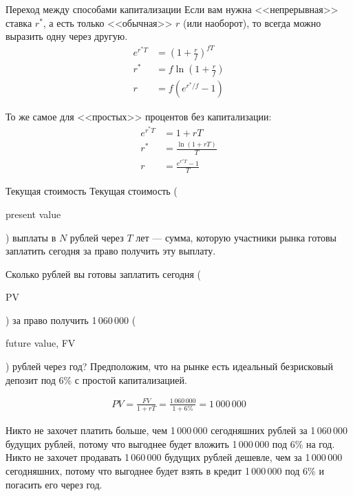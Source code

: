 \documentclass{beamer}
\newcommand{\en}[1]{\begin{otherlanguage}{english}#1\end{otherlanguage}}
\begin{document}
\begin{frame}{Переход между способами капитализации}
\justify
Если вам нужна <<непрерывная>> ставка $r^*$, а есть только <<обычная>> $r$ (или наоборот), то всегда можно выразить одну через другую.
\begin{align*}
e^{r^*T} &= \left(1 + \frac{r}{f}\right)^{fT} \\
r^* &= f\ln \left(1 + \frac{r}{f}\right) \\
r &= f\left(e^{r^*/f} - 1\right)
\end{align*}

\justify
То же самое для <<простых>> процентов без капитализации:
\begin{align*}
e^{r^*T} &= 1+rT \\
r^* &= \frac{\ln(1+rT)}{T} \\
r &= \frac{e^{r^*T}-1}{T}
\end{align*}

\end{frame}



\begin{frame}{Текущая стоимость}
\justify
Текущая стоимость (\en{present value}) выплаты в $N$ рублей через $T$ лет --- сумма, 
которую участники рынка готовы заплатить сегодня за право получить эту выплату.

\justify
Сколько рублей вы готовы заплатить сегодня (\en{PV}) за право получить 1\,060\,000 (\en{future value, FV}) рублей через год? Предположим, что на рынке есть идеальный безрисковый депозит под 6\% с простой капитализацией.

\begin{align*}
PV = \frac{FV}{1+rT} = \frac{1\,060\,000}{1 + 6\%} = 1\,000\,000
\end{align*}

\justify
Никто не захочет платить больше, чем 1\,000\,000 сегодняшних рублей за 1\,060\,000 будущих рублей, потому что выгоднее будет вложить 1\,000\,000 под 6\% на год. Никто не захочет продавать 1\,060\,000 будущих рублей дешевле, чем за 1\,000\,000 сегодняшних, потому что выгоднее будет взять в кредит 1\,000\,000 под 6\% и погасить его через год.
\end{frame}
\end{document}
